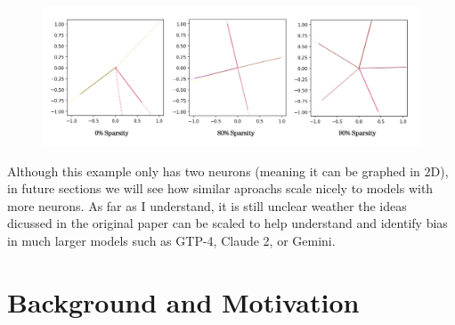 \documentclass{article} %
\begin{document}
\begin{figure}[h]
    \centering
    \includegraphics[width=0.68\linewidth]{section_1/images/section1_replicated_graphic.png}
    \captionsetup{font=footnotesize} %
    \label{fig:section1_replication}
\end{figure}

Although this example only has two neurons (meaning it can be graphed in 2D), in
future sections we will see how similar aproachs scale nicely to models with more neurons.
As far as I understand, it is still unclear weather the ideas 
dicussed in the original paper can be scaled to help understand and identify bias in 
much larger models such as GTP-4, Claude 2, or Gemini.



\section{Background and Motivation}
\end{document}

